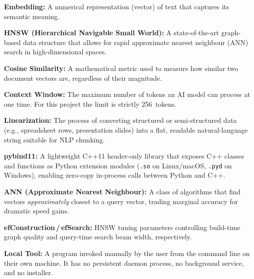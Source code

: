 \documentclass[12pt, a4paper]{article}
\begin{document}
\begin{tcolorbox}[standardbox, colback=white, colframe=ctPurple, leftrule=4pt]
\begin{prolist}
    \item \textbf{Embedding:} A numerical representation (vector) of text
    that captures its semantic meaning.

    \item \textbf{HNSW (Hierarchical Navigable Small World):} A
    state-of-the-art graph-based data structure that allows for rapid
    approximate nearest neighbour (ANN) search in high-dimensional spaces.

    \item \textbf{Cosine Similarity:} A mathematical metric used to measure
    how similar two document vectors are, regardless of their magnitude.

    \item \textbf{Context Window:} The maximum number of tokens an AI model
    can process at one time. For this project the limit is strictly
    256~tokens.

    \item \textbf{Linearization:} The process of converting structured or
    semi-structured data (e.g., spreadsheet rows, presentation slides) into
    a flat, readable natural-language string suitable for NLP chunking.

    \item \textbf{pybind11:} A lightweight C++11 header-only library that
    exposes C++ classes and functions as Python extension modules
    (\texttt{.so} on Linux/macOS, \texttt{.pyd} on Windows), enabling
    zero-copy in-process calls between Python and C++.

    \item \textbf{ANN (Approximate Nearest Neighbour):} A class of
    algorithms that find vectors \textit{approximately} closest to a query
    vector, trading marginal accuracy for dramatic speed gains.

    \item \textbf{efConstruction\,/\,efSearch:} HNSW tuning parameters
    controlling build-time graph quality and query-time search beam width,
    respectively.

    \item \textbf{Local Tool:} A program invoked manually by the user from
    the command line on their own machine. It has no persistent daemon
    process, no background service, and no installer.
\end{prolist}
\end{tcolorbox}
\end{document}
